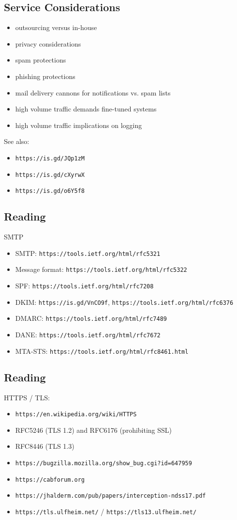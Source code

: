 \documentclass[xga]{xdvislides}
\begin{document}
\subsection{Service Considerations}
\begin{itemize}
	\item outsourcing versus in-house
	\item privacy considerations
	\item spam protections
	\item phishing protections
	\item mail delivery cannons for notifications vs. spam lists
	\item high volume traffic demands fine-tuned systems
	\item high volume traffic implications on logging
\end{itemize}
\vspace{.5in}
See also:
\begin{itemize}
	\item {\tt https://is.gd/JQp1zM}
	\item {\tt https://is.gd/cXyrwX}
	\item {\tt https://is.gd/o6Y5f8}
\end{itemize}

\subsection{Reading}
SMTP
\begin{itemize}
	\item SMTP: {\tt https://tools.ietf.org/html/rfc5321}
	\item Message format: {\tt https://tools.ietf.org/html/rfc5322}
	\item SPF: {\tt https://tools.ietf.org/html/rfc7208}
	\item DKIM: {\tt https://is.gd/VnCO9f}, {\tt https://tools.ietf.org/html/rfc6376}
	\item DMARC: {\tt https://tools.ietf.org/html/rfc7489}
	\item DANE: {\tt https://tools.ietf.org/html/rfc7672}
	\item MTA-STS: {\tt https://tools.ietf.org/html/rfc8461.html}
\end{itemize}

\subsection{Reading}
HTTPS / TLS:
\begin{itemize}
	\item {\tt https://en.wikipedia.org/wiki/HTTPS}
	\item RFC5246 (TLS 1.2) and RFC6176 (prohibiting SSL)
	\item RFC8446 (TLS 1.3)
	\item {\tt https://bugzilla.mozilla.org/show\_bug.cgi?id=647959}
	\item {\tt https://cabforum.org}
	\item {\tt https://jhalderm.com/pub/papers/interception-ndss17.pdf}
	\item {\tt https://tls.ulfheim.net/} / {\tt https://tls13.ulfheim.net/}
\end{itemize}

\end{document}
